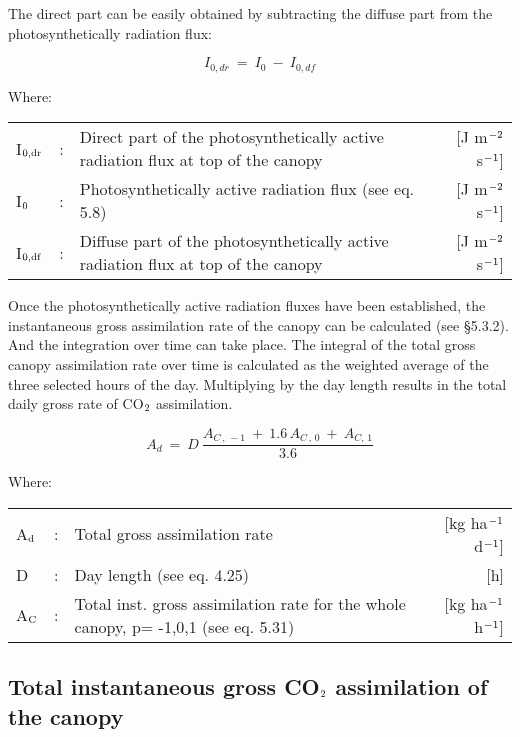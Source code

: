 The direct part can be easily obtained by subtracting the diffuse part from the
 photosynthetically radiation flux:

\begin{equation}
I _{0,dr} ~=~ I _{0} ~-~I _{0,df} 
\end{equation}

 
Where:\\
\begin{tabularx}{\textwidth}{llXr}
I$_{{\rm 0,dr}}$ &:& Direct part of the photosynthetically active radiation flux 
   at top of the canopy    &    [J m$^{{\rm -2}}$ s$^{{\rm -1}}$]\\
I$_{{\rm 0}}$ &:& Photosynthetically active radia\-tion flux (see eq. 5.8)    &    [J m$^{{\rm -2}}$ s$^{{\rm -1}}$]\\
I$_{{\rm 0,df}}$ &:& Diffuse part of the photosynthetically active radiation flux 
   at top of the canopy     &   [J m$^{{\rm -2}}$ s$^{{\rm -1}}$]\\
\end{tabularx}

Once the photosynthetically active radiation fluxes have been established, the 
instanta\-neous gross assimilation rate of the canopy can be calculated (see \S 5.3.2). And the 
integration over time can take place.
The integral of the total gross canopy assimilation rate over time is calculated as the
weighted average of the three selected hours of the day. Multiply\-ing by the day length
results in the total daily gross rate of CO$_{{\rm 2}}$ assimilation. 

\begin{equation}
A _{d} ~=~D~{\frac{A _{C\, ,\, -1} ~+~ 1.6\, A _{C\, ,\, 0} ~+~ A _{C,\, 1} }{3.6}}
\end{equation}


Where:\\
\begin{tabularx}{\textwidth}{llXr}
A$_{{\rm d}}$ &:& Total gross assimilation rate    &    [kg ha$^{{\rm -1}}$ d$^{{\rm -1}}$]\\
D &:& Day length (see eq. 4.25)   &     [h]\\
A$_{{\rm C}}$ &:& Total inst. gross assimila\-tion rate for
   the whole canopy, p= -1,0,1 (see eq. 5.31)    &    [kg ha$^{{\rm -1}}$ h$^{{\rm -1}}$]\\
\end{tabularx}

\subsection{Total instantaneous gross CO$_{{\rm 2}}$ assimilation of the canopy  }  

